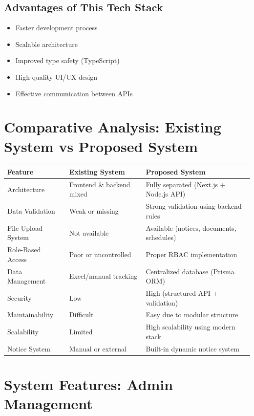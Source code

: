 \subsection*{Advantages of This Tech Stack}

\begin{itemize}
    \item Faster development process
    \item Scalable architecture
    \item Improved type safety (TypeScript)
    \item High-quality UI/UX design
    \item Effective communication between APIs
\end{itemize}

\section{Comparative Analysis: Existing System vs Proposed System}

\begin{tabular}{|p{4cm}|p{5cm}|p{5cm}|}
\hline
{Feature} & {Existing System} & {Proposed System} \\
\hline
Architecture & Frontend \& backend mixed & Fully separated (Next.js + Node.js API) \\
\hline
Data Validation & Weak or missing & Strong validation using backend rules \\
\hline
File Upload System & Not available & Available (notices, documents, schedules) \\
\hline
Role-Based Access & Poor or uncontrolled & Proper RBAC implementation \\
\hline
Data Management & Excel/manual tracking & Centralized database (Prisma ORM) \\
\hline
Security & Low & High (structured API + validation) \\
\hline
Maintainability & Difficult & Easy due to modular structure \\
\hline
Scalability & Limited & High scalability using modern stack \\
\hline
Notice System & Manual or external & Built-in dynamic notice system \\
\hline
\end{tabular}

\section{System Features: Admin Management}

